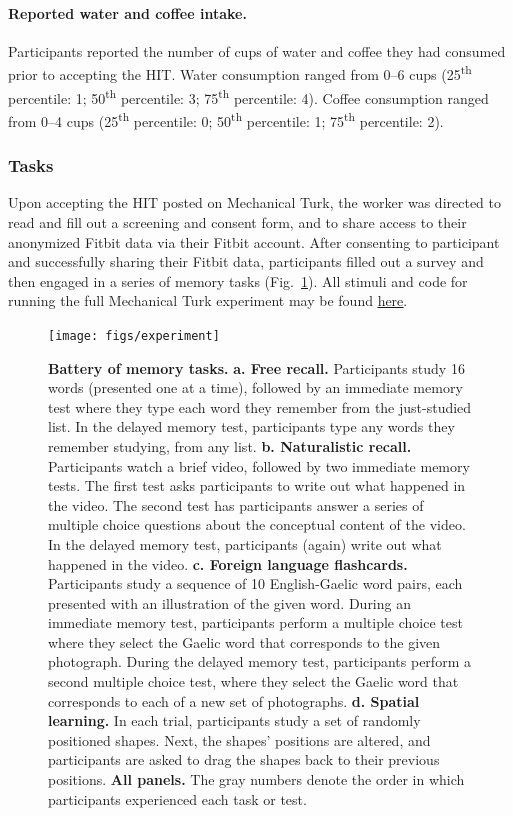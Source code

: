 \documentclass[10pt]{article}
\begin{document}
\paragraph{Reported water and coffee intake.}
Participants reported the number of cups of water and coffee they had
consumed prior to accepting the HIT.  Water consumption ranged from
0--6 cups (25\textsuperscript{th} percentile: 1;
50\textsuperscript{th} percentile: 3; 75\textsuperscript{th}
percentile: 4).  Coffee consumption ranged from 0--4 cups (25\textsuperscript{th} percentile: 0;
50\textsuperscript{th} percentile: 1; 75\textsuperscript{th}
percentile: 2).


\subsubsection*{Tasks}
Upon accepting the HIT posted on Mechanical Turk, the worker was
directed to read and fill out a screening and consent form, and to
share access to their anonymized Fitbit data via their Fitbit account.
After consenting to participant and successfully sharing their Fitbit
data, participants filled out a survey and then engaged in a series of
memory tasks (Fig.~\ref{fig:tasks}).  All stimuli and code for running
the full Mechanical Turk experiment may be found
\href{https://github.com/ContextLab/brainfit-task}{\underline{here}}.

\begin{figure}[tp]
\centering
\texttt{[image: figs/experiment]}
\caption{\textbf{Battery of memory tasks.}  \textbf{a.  Free recall.}
Participants study 16 words (presented one at a time), followed by an
immediate memory test where they type
each word they remember from the just-studied list.  In the delayed
memory test, participants type any words they remember studying, from
any list.  \textbf{b. Naturalistic recall.}  Participants watch a
brief video, followed by two immediate memory tests.  The first test
asks participants to write out what happened in the video.  The second
test has participants answer a series of multiple choice questions
about the conceptual content of the video.  In the delayed memory
test, participants (again) write out what happened in the video.
\textbf{c. Foreign language flashcards.}  Participants study a
sequence of 10 English-Gaelic word pairs, each presented with an
illustration of the given word.  During an immediate memory test,
participants perform a multiple choice test where they select the
Gaelic word that corresponds to the given photograph.  During the
delayed memory test, participants perform a second multiple choice
test, where they select the Gaelic word that corresponds to each of a
new set of photographs.  \textbf{d. Spatial learning.}  In each trial,
participants
study a set of randomly positioned shapes.  Next, the shapes'
positions are altered, and participants are asked to drag the shapes
back to their previous positions.  \textbf{All panels.}  The gray
numbers denote the order in which participants experienced each task
or test.}
\label{fig:tasks}
\end{figure}
\end{document}
